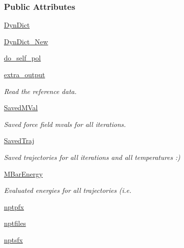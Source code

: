 \subsubsection*{\-Public \-Attributes}
\begin{DoxyCompactItemize}
\item 
\hyperlink{classforcebalance_1_1tinkerio_1_1Liquid__TINKER_a1bf1cda5011e64ba2f7ddfb7d49ab0bd}{\-Dyn\-Dict}
\item 
\hyperlink{classforcebalance_1_1tinkerio_1_1Liquid__TINKER_a75415943b97ffb906c0ecca026c150a2}{\-Dyn\-Dict\-\_\-\-New}
\item 
\hyperlink{classforcebalance_1_1liquid_1_1Liquid_af7ba85e825dfe42a384c2eb2e7cc1f0c}{do\-\_\-self\-\_\-pol}
\item 
\hyperlink{classforcebalance_1_1liquid_1_1Liquid_a3d7e00beaf0c7d71751699e05b87c501}{extra\-\_\-output}
\begin{DoxyCompactList}\small\item\em \-Read the reference data. \end{DoxyCompactList}\item 
\hyperlink{classforcebalance_1_1liquid_1_1Liquid_a110998789cb046248b78318c97872930}{\-Saved\-M\-Val}
\begin{DoxyCompactList}\small\item\em \-Saved force field mvals for all iterations. \end{DoxyCompactList}\item 
\hyperlink{classforcebalance_1_1liquid_1_1Liquid_acab3a497d408af6d152a460ecba40583}{\-Saved\-Traj}
\begin{DoxyCompactList}\small\item\em \-Saved trajectories for all iterations and all temperatures \-:) \end{DoxyCompactList}\item 
\hyperlink{classforcebalance_1_1liquid_1_1Liquid_a92ec9101fdcdadf9c9a3975bac0b409e}{\-M\-Bar\-Energy}
\begin{DoxyCompactList}\small\item\em \-Evaluated energies for all trajectories (i.\-e. \end{DoxyCompactList}\item 
\hyperlink{classforcebalance_1_1liquid_1_1Liquid_a2e379d0030f788029f9778b33f456cb8}{nptpfx}
\item 
\hyperlink{classforcebalance_1_1liquid_1_1Liquid_a748b44c6ea59a4a79bc8413e5d64b88a}{nptfiles}
\item 
\hyperlink{classforcebalance_1_1liquid_1_1Liquid_a13401c3bd91481f840975e95770c107d}{nptsfx}

\end{DoxyCompactItemize}

